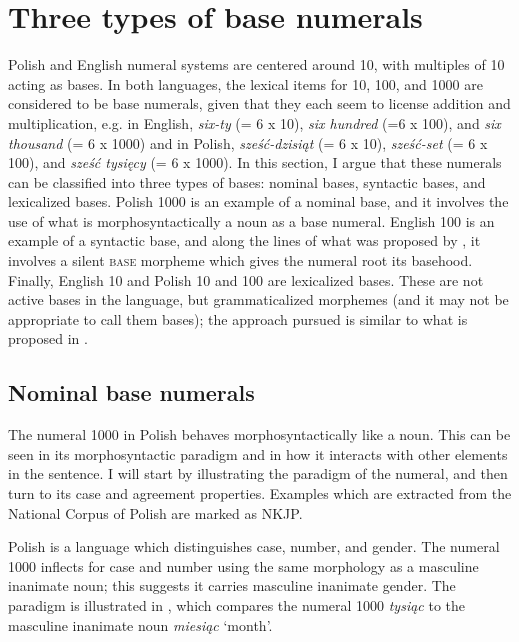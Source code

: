 \documentclass[output=paper]{langscibook}
\begin{document}
\section {Three types of base numerals}\label{klo:typesOfBases}

Polish and English numeral systems are centered around 10, with multiples of 10 acting as bases. In both languages, the lexical items for 10, 100, and 1000 are considered to be base numerals, given that they each seem to license addition and multiplication, e.g. in English, \textit{six-ty} (= 6 x 10), \textit{six hundred} (=6 x 100), and \textit{six thousand} (= 6 x 1000) and in Polish, \textit{sześć-dzisiąt} (= 6 x 10), \textit{sześć-set} (= 6 x 100), and \textit{sześć tysięcy} (= 6 x 1000). In this section, I argue that these numerals can be classified into three types of bases: nominal bases, syntactic bases, and lexicalized bases. Polish 1000 is an example of a nominal base, and it involves the use of what is morphosyntactically a noun as a base numeral. English 100 is an example of a syntactic base, and along the lines of what was proposed by \citet{kayne2005bases}, it involves a silent \textsc{base} morpheme which gives the numeral root its basehood. Finally, English 10 and Polish 10 and 100 are lexicalized bases. These are not active bases in the language, but grammaticalized morphemes (and it may not be appropriate to call them bases); the approach pursued is similar to what is proposed in \citet{wagiel2017several}.


\subsection{Nominal base numerals} \label{klo:nominalBase}

The numeral 1000 in Polish behaves morphosyntactically like a noun. This can be seen in its morphosyntactic paradigm and in how it interacts with other elements in the sentence. I will start by illustrating the paradigm of the numeral, and then turn to its case and agreement properties. Examples which are extracted from the National Corpus of Polish are marked as NKJP.

Polish is a language which distinguishes case, number, and gender. The numeral 1000 inflects for case and number using the same morphology as a masculine inanimate noun; this suggests it carries masculine inanimate gender. The paradigm is illustrated in , which compares the numeral 1000 \textit{tysiąc} to the masculine inanimate noun \textit{miesiąc} `month'.
\end{document}

